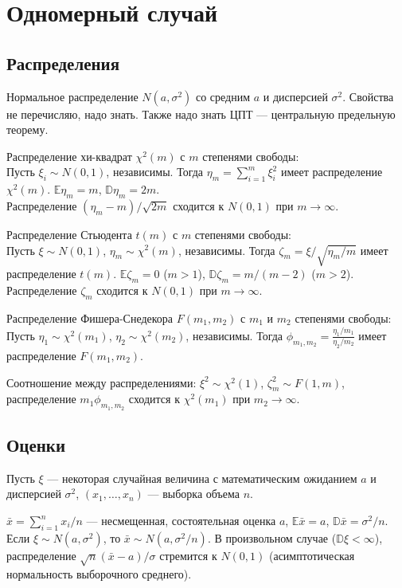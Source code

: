 \documentclass[12 pt]{article}
\def\E{\mathbb{E}}
\def\D{\mathbb{D}}
\begin{document}
\section*{Одномерный случай}
\subsection*{Распределения}

Нормальное распределение $N(a,\sigma^2)$ со средним $a$ и дисперсией $\sigma^2$. Свойства не перечисляю, надо знать. Также надо знать ЦПТ --- центральную предельную теорему.

Распределение хи-квадрат $\chi^2(m)$ с $m$ степенями свободы:\\
Пусть $\xi_i\sim N(0,1)$, независимы. Тогда $\eta_m = \sum_{i=1}^m \xi_i^2$
имеет распределение $\chi^2(m)$. $\E \eta_m = m$, $\D \eta_m = 2m$.\\
Распределение $(\eta_m -m )/\sqrt{2m}$ сходится к $N(0,1)$ при $m\rightarrow \infty$.

Распределение Стьюдента $t(m)$ с $m$ степенями свободы:\\
Пусть $\xi\sim N(0,1)$, $\eta_m\sim \chi^2(m)$, независимы. Тогда $\zeta_m = \xi/\sqrt{\eta_m/m}$
имеет распределение $t(m)$. $\E \zeta_m = 0$ ($m>1$), $\D \zeta_m = m/(m-2)$ ($m>2$).\\
Распределение $\zeta_m$ сходится к $N(0,1)$ при $m\rightarrow \infty$.

Распределение Фишера-Снедекора $F(m_1,m_2)$ с $m_1$ и $m_2$ степенями свободы:\\
Пусть $\eta_1\sim \chi^2(m_1)$, $\eta_2\sim \chi^2(m_2)$, независимы. Тогда $\phi_{m_1,m_2} = \frac{\eta_1/m_1}{\eta_2/m_2}$
имеет распределение $F(m_1,m_2)$.

Соотношение между распределениями:
$\xi^2 \sim \chi^2(1)$, $\zeta_m^2 \sim F(1,m)$, распределение $m_1\phi_{m_1,m_2}$ сходится к $\chi^2(m_1)$ при $m_2\rightarrow \infty$.

\subsection*{Оценки}
Пусть $\xi$ --- некоторая случайная величина с математическим ожиданием $a$ и дисперсией $\sigma^2$,
$(x_1,\ldots,x_n)$ --- выборка объема $n$.

$\bar{x} =\sum_{i=1}^n x_i/n$ --- несмещенная, состоятельная оценка $a$, $\E\bar{x} = a$, $\D\bar{x} = \sigma^2/n$.
Если $\xi\sim N(a,\sigma^2)$, то $\bar{x}\sim N(a, \sigma^2/n)$. В произвольном случае ($\D \xi < \infty$),
распределение $\sqrt{n}(\bar{x}-a) / \sigma$ стремится к $N(0, 1)$ (асимптотическая нормальность выборочного среднего).
\end{document}
